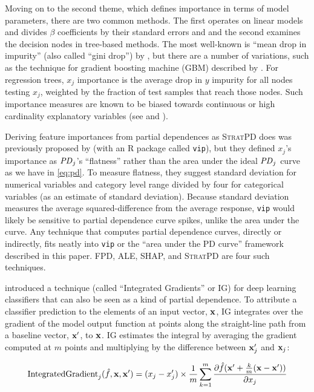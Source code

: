 \documentclass[11pt]{article}
\newcommand{\todo}[1]{{{\small\color{red}{[#1]}}}}
\newcommand{\spd}{\fontfamily{cmr}\textsc{\small StratPD}}
\begin{document}
Moving on to the second theme, which defines importance in terms of model parameters, there are two common methods. The first operates on linear models and divides $\beta$ coefficients by their standard errors and and the second examines the decision nodes in tree-based methods. The most well-known is ``mean drop in impurity'' (also called ``gini drop'') by \cite{CART}, but there are a number of variations, such as the technique for gradient boosting machine (GBM) described by \cite{PDP}. For regression trees, $x_j$ importance is the average drop in $y$ impurity for all nodes testing $x_j$, weighted by the fraction of test samples that reach those nodes. Such importance measures are known to be biased towards continuous or high cardinality explanatory variables (see \citealt{permbias} and \citealt{RFunbiased}).

Deriving feature importances from partial dependences as \spd{} does was previously proposed by \cite{pdvim} (with an R package called {\tt vip}), but they defined $x_j$'s importance as ${\it PD}_j$'s ``flatness'' rather than the area under the ideal ${\it PD}_j$ curve as we have in \eqref{eq:pd}. To measure flatness, they suggest standard deviation for numerical variables and category level range divided by four for categorical variables (as an estimate of standard deviation).  Because standard deviation measures the average squared-difference from the average response, {\tt vip} would likely be sensitive to partial dependence curve spikes, unlike the area under the curve.  Any technique that computes partial dependence curves, directly or indirectly, fits neatly into {\tt vip} or the ``area under the PD curve'' framework described in this paper. FPD, ALE, SHAP, and \spd{} are four such techniques. \todo{they do diff from $\bar{y}$ not 0.}

\citet{intgrad} introduced a technique (called ``Integrated Gradients'' or IG) for deep learning classifiers that can also be seen as a kind of partial dependence. To attribute a classifier prediction to the elements of an input vector, $\bf x$, IG integrates over the gradient of the model output function at points along the straight-line path from a baseline vector, $\bf x'$, to $\bf x$. IG estimates the integral by averaging the gradient computed at $m$ points and multiplying by the difference between ${\bf x}'_j$ and ${\bf x}_j$:

\begin{equation}
\text{IntegratedGradient}_j(\hat{f}, {\bf x},{\bf x'}) = (x_j - x'_j) \times \frac{1}{m} \sum_{k=1}^{m} \frac{\partial \hat{f}({\bf x}' + \frac{k}{m}({\bf x}-{\bf x}'))}{\partial x_j}
\end{equation}
\end{document}
